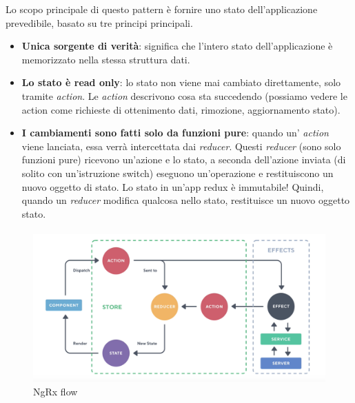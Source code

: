 Lo scopo principale di questo pattern è fornire uno stato dell'applicazione prevedibile, basato su tre principi principali.

\begin{itemize}
    \item \textbf{Unica sorgente di verità}: significa che l'intero stato dell'applicazione è memorizzato nella
    stessa struttura dati.
    \item \textbf{Lo stato è read only}: lo stato non viene mai cambiato direttamente, 
    solo tramite \textit{action}. Le \textit{action} descrivono cosa sta succedendo (possiamo vedere le action
    come richieste di ottenimento dati, rimozione, aggiornamento stato).
    \item \textbf{I cambiamenti sono fatti solo da funzioni pure}: quando un' \textit{action} viene lanciata, essa verrà
    intercettata dai \textit{reducer}.
    Questi \textit{reducer} (sono solo funzioni pure) ricevono un'azione e lo stato, a seconda dell'azione inviata 
    (di solito con un'istruzione switch) eseguono un'operazione e restituiscono un nuovo oggetto di stato. 
    Lo stato in un'app redux è immutabile! Quindi, quando un \textit{reducer} modifica qualcosa nello stato, 
    restituisce un nuovo oggetto stato.
\end{itemize}

\paragraph{}
\begin{figure}[h!]
    \centering  
    \caption{NgRx flow}
    \includegraphics[scale=0.4]{img/cap2/ngrx}
\end{figure}
\paragraph{}

